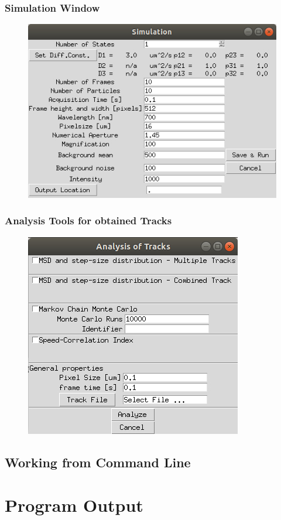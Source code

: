 \documentclass[oneside,letterpaper]{scrartcl}
\begin{document}
\subsubsection{Simulation Window}
\begin{figure}
\includegraphics[scale=1]{Figures/SimulationGUI.jpg}
\end{figure}
\subsubsection{Analysis Tools for obtained Tracks}
\begin{figure}
\includegraphics[scale=1.]{Figures/AnalysisGUI.jpg}
\end{figure}
\subsection{Working from Command Line}

\section{Program Output}



\end{document}

